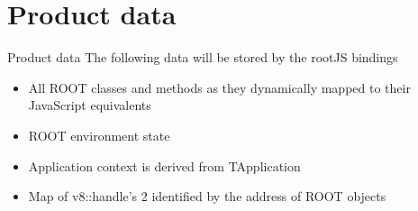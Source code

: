 \section{Product data}
\begin{frame}{Product data}
	The following data will be stored by the rootJS bindings
	\begin{itemize}
		\item All ROOT classes and methods as they dynamically mapped to their JavaScript equivalents
		\item ROOT environment state 
		\item Application context is derived from TApplication
		\item Map of v8::handle’s 2 identified by the address of ROOT objects
	\end{itemize}
\end{frame}
